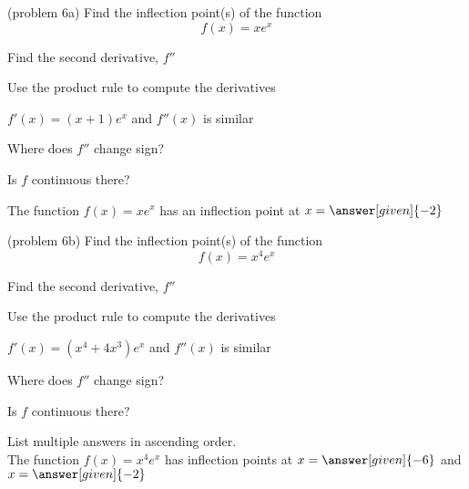 \documentclass{ximera}
\begin{document}
\begin{problem}(problem 6a)
  Find the inflection point(s) of the function
  \[
     f(x) = xe^x
  \]
  
    \begin{hint}
      Find the second derivative, $f''$
    \end{hint}
    \begin{hint}
      Use the product rule to compute the derivatives
    \end{hint}
		\begin{hint}
      $f'(x) = (x+1)e^x$ and $f''(x)$ is similar
    \end{hint}
		\begin{hint}
      Where does $f''$ change sign?
    \end{hint}
    \begin{hint}
      Is $f$ continuous there?
    \end{hint}  
		The function $f(x) = xe^x$ has an inflection 
		point at $x =\answer[given]{-2}$
		
\end{problem}

\begin{problem}(problem 6b)
  Find the inflection point(s) of the function
  \[
     f(x) = x^4e^x
  \]
  
    \begin{hint}
      Find the second derivative, $f''$
    \end{hint}
    \begin{hint}
      Use the product rule to compute the derivatives
    \end{hint}
		\begin{hint}
      $f'(x) = (x^4+4x^3)e^x$ and $f''(x)$ is similar
    \end{hint}
		\begin{hint}
      Where does $f''$ change sign?
    \end{hint}
    \begin{hint}
      Is $f$ continuous there?
    \end{hint} 
		List multiple answers in ascending order.\\
		The function $f(x) = x^4e^x$ has inflection points at 
		$x =\answer[given]{-6}$ and $x =\answer[given]{-2}$
		
\end{problem}
\end{document}
